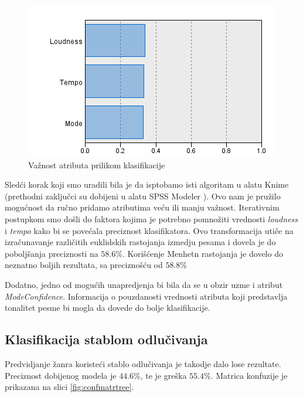 \begin{figure}[H]
    \centering
    \includegraphics[scale=0.7]{resources/KNN_pred_imp.PNG}
    \caption{Va\v{z}nost atributa prilikom klasifikacije}
    \label{fig:KNNvaznost}
\end{figure}

Sled\'c{}i korak koji smo uradili bila je da isptobamo isti algoritam u alatu Knime \cite{KNIME} (prethodni zaklju\v{c}ci su dobijeni u alatu SPSS Modeler \cite{SPSS}). Ovo nam je pru\v{z}ilo mogu\'c{}nost da ru\v{c}no pridamo atributima ve\'c{}u ili manju va\v{z}nost. Iterativnim postupkom smo do\v{s}li do faktora kojima je potrebno pomno\v{z}iti vrednosti \emph{loudness} i \emph{tempo} kako bi se pove\'c{}ala preciznost klasifikatora. Ovo transformacija uti\v{c}e na izra\v{c}unavanje razli\v{c}itih euklidskih rastojanja izmedju pesama i dovela je do pobolj\v{s}anja preciznosti na $58.6\%$. Kori\v{s}\'c{}enje Menhetn rastojanja je dovelo do neznatno boljih rezultata, sa precizno\v{s}\'c{}u od $58.8\%$

Dodatno, jedno od mogu\'c{}ih unapredjenja bi bila da se u obzir uzme i atribut \emph{ModeConfidence}. Informacija o pouzdanosti vrednosti atributa koji predstavlja tonalitet pesme bi mogla da dovede do bolje klasifikacije.

\subsection{Klasifikacija stablom odlu\v{c}ivanja}
\label{subsec:stablo}
Predvidjanje \v{z}anra koriste\'c{}i stablo odlu\v{c}ivanja je takodje dalo lose rezultate. Preciznost dobijenog modela je $44.6\%$, te je gre\v{s}ka $55.4\%$. Matrica konfuzije je prikazana na slici \ref{fig:confmatrtree}.

